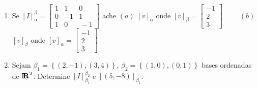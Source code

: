 \documentclass{report}
\begin{document}
\begin{Exercise}
\begin{enumerate}

\item \label{32lista3} Se $\left[ I\right] _{\alpha }^{\beta
}=\left[
\begin{array}{rrr}
1 & 1 & 0 \\
0 & -1 & 1 \\
1 & 0 & \,-1
\end{array}
\right] $ ache \newline $(a)$ $\left[ v\right] _{\alpha }$ onde
$\left[ v\right] _{\beta }=\left[
\begin{array}{r}
-1 \\
2 \\
3
\end{array}
\right] \qquad $ $(b)$ $\left[ v\right] _{\beta }$ onde $\left[
v\right] _{\alpha }=\left[
\begin{array}{r}
-1 \\
2 \\
3
\end{array}
\right] $


\item \label{33lista3} Sejam $\beta _{1}=\left\{ \left(
2,-1\right) ,\left( 3,4\right) \right\} $, $\beta _{2}=\left\{
\left( 1,0\right) ,\left( 0,1\right)
\right\} $ bases ordenadas de $%
\mbox{${\rm I}\!\mbox{\boldmath $ {\rm R}$}$}%
^{2}$. Determine $\left[ I\right] _{\beta _{1}}^{\beta _{2}}$ e $\left[
\left( 5,-8\right) \right] _{\beta _{1}}$.



\end{enumerate}
\end{Exercise}
\end{document}

